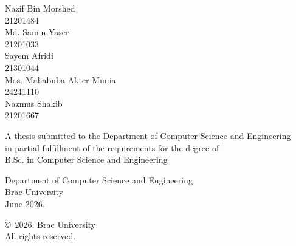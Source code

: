 \begin{titlepage}
\renewcommand*{\thepage}{Title} %

    \begin{center}
        \vspace*{3cm} %

        {\fontsize{16pt}{22pt}\selectfont{Hybrid CNN--Transformer Networks with Clinical Metadata for Skin Lesion Classification}
        } %

        \vspace{1.5cm}


        \vspace{0.5cm}

        	Nazif Bin Morshed\\
	        21201484\\
            Md. Samin Yaser\\
	        21201033\\
	        Sayem Afridi\\
	        21301044\\
	        Mos. Mahabuba Akter Munia\\
	        24241110\\
	        Nazmus Shakib\\
	        21201667

        \vspace{1.5cm}

        	A thesis submitted to the Department of Computer Science and Engineering\\
            in partial fulfillment of the requirements for the degree of\\
            B.Sc. in Computer Science and Engineering

        \vspace{2.5cm}

    		Department of Computer Science and Engineering\\
            Brac University\\
            June 2026.

        \vspace{3cm}

    		\copyright\ 2026. Brac University\\
            All rights reserved.

    \end{center}

\end{titlepage}
